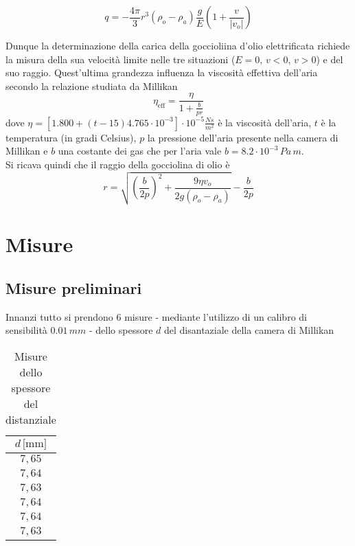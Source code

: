 \documentclass[]{article}
\let\oldsection\section%
\renewcommand{\section}{%
	\renewcommand{\theequation}{\thesection.\arabic{equation}}%
	\oldsection}%
\let\oldsubsection\subsection%
\renewcommand{\subsection}{%
	\renewcommand{\theequation}{\thesubsection.\arabic{equation}}%
	\oldsubsection}%
\begin{document}
    \begin{equation}
        \label{2}
        q= - \frac{4 \pi}{3} r^3 (\rho_o - \rho_a) \frac{g}{E} \left( 1 + \frac{v}{\left| v_o\right|} \right)
    \end{equation}

    Dunque la determinazione della carica della goccioliina d'olio elettrificata richiede la misura della sua velocità limite nelle tre situazioni ($E=0, \, v<0, \, v>0$) e del suo raggio. Quest'ultima grandezza influenza la viscosità effettiva dell'aria secondo la relazione studiata da Millikan
    \begin{equation}
        \label{eta_eff}
        \eta_{\text{eff}}=\frac{\eta}{1 + \frac{b}{p r}}
    \end{equation}
    dove $\displaystyle \eta = \left[1.800 + (t -15)4.765 \cdot 10^{-3} \right] \cdot 10^{-5} \frac{Ns}{m^2}$ è la viscosità dell'aria, $t$ è la temperatura (in gradi Celsius), $p$ la pressione dell'aria presente nella camera di Millikan e $b$ una costante dei gas che per l'aria vale $b=8.2 \cdot 10^{-3} \, Pa \, m$.\\ Si ricava quindi che il raggio della gocciolina di olio è 
    \begin{equation}
        \label{raggio}
        r=\sqrt{\left( \frac{b}{2p} \right) ^2 + \frac{9 \eta v_o}{2 g \left(\rho_o - \rho_a \right)}} - \frac{b}{2p}
    \end{equation}


    \section{Misure}

    \subsection{Misure preliminari}
    \label{par:misure-preliminari}

    Innanzi tutto si prendono 6 misure - mediante l'utilizzo di un calibro di sensibilità $ 0.01\, mm $ - dello spessore $ d $ del disantaziale della camera di Millikan

    \begin{table}[H]
        \centering
    
        \begin{tabular}{||c||}
            \hline
            $d\, \text{[mm]} $ \\
            \hline\hline
    
            $ 7,65 $ \\\hline
            $ 7,64 $ \\\hline
            $ 7,63 $ \\\hline
            $ 7,64 $ \\\hline
            $ 7,64 $ \\\hline
            $ 7,63 $ \\\hline

        
        \end{tabular}
        \caption{Misure dello spessore del distanziale}
        \label{distanziale}
    \end{table}
\end{document}
